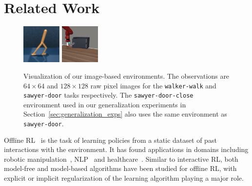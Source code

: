 \section{Related Work}
\label{sec:related}

\begin{figure}[!t]
    \centering
    \includegraphics[width=0.175\textwidth]{walker_task.png}
    \includegraphics[width=0.175\textwidth]{dooropen_task.png}
    \vspace{-0.2cm}
    \caption{\footnotesize Visualization of our image-based environments. The observations are $64\times 64$ and $128\times 128$ raw pixel images for the \texttt{walker-walk} and \texttt{sawyer-door} tasks respectively. The \texttt{sawyer-door-close} environment used in our generalization experiments in Section~\ref{sec:generalization_exps} also uses the same environment as \texttt{sawyer-door}.}
    \label{fig:visual}
    \vspace{-0.6cm}
\end{figure}

Offline RL~\citep{ernst2005tree, riedmiller2005neural, LangeGR12, levine2020offline} is the task of learning policies from a static dataset of past interactions with the environment. It has found applications in domains including robotic manipulation~\citep{ kalashnikov2018scalable, mandlekar2020iris, Rafailov2020LOMPO,singh2020cog}, NLP~\citep{jaques2019way,jaques2020human} and healthcare~\citep{shortreed2011informing, Wang2018SupervisedRL}. Similar to interactive RL, both model-free and model-based algorithms have been studied for offline RL, with explicit or implicit regularization of the learning algorithm playing a major role.




